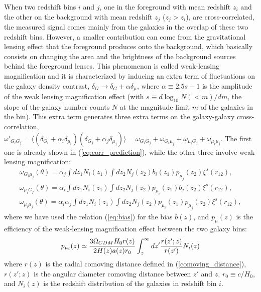 When two redshift bins $i$ and $j$, one in the foreground with mean redshift $z_i$ and the other on the background with mean redshift $z_j$ ($z_j > z_i$), are cross-correlated, the measured signal comes mainly from the galaxies in the overlap of these two redshift bins. However, a smaller contribution can come from the gravitational lensing effect that the foreground produces onto the background, which basically consists on changing the area and the brightness of the background sources behind the foreground lenses. This phenomenon is called weak-lensing magnification and it is characterized by inducing an extra term of fluctuations on the galaxy density contrast, $\delta_G \rightarrow \delta_G + \alpha \delta_\mu$, where $\alpha \equiv 2.5s-1$ is the amplitude of the weak lensing magnification effect (with $s \equiv d\log_{10}N(<m) / dm $, the slope of the galaxy number counts $N$ at the magnitude limit $m$ of the galaxies in the bin). This extra term generates three extra terms on the galaxy-galaxy cross-correlation, $\omega'_{G_iG_j} = \langle (\delta_{G_i} + \alpha_i \delta_{\mu_i}) (\delta_{G_j} + \alpha_j \delta_{\mu_j})\rangle = \omega_{G_iG_j} + \omega_{G_i\mu_j} + \omega_{\mu_i G_j} + \omega_{\mu_i \mu_j}$. The first one is already shown in (\ref{eq:corr_prediction}), while the other three involve weak-lensing magnification:
\begin{eqnarray}
\omega_{G_i\mu_j} (\theta) = \alpha_j \int dz_1 N_i(z_1) \int dz_2 N_j(z_2) b_i(z_1) p_{\mu_j}(z_2) \xi^s(r_{12}), \\
\omega_{\mu_iG_j} (\theta) = \alpha_i \int dz_1 N_i(z_1) \int dz_2 N_j(z_2) p_{\mu_i}(z_1) b_j(z_2) \xi^s(r_{12}), \\
\omega_{\mu_i\mu_j} (\theta) = \alpha_i \alpha_j \int dz_1 N_i(z_1) \int dz_2 N_j(z_2) p_{\mu_i}(z_1) p_{\mu_j}(z_2) \xi^s(r_{12}),
\end{eqnarray}
where we have used the relation (\ref{eq:bias}) for the bias $b(z)$, and $p_{\mu}(z)$ is the efficiency of the weak-lensing magnification effect between the two galaxy bins: 
\begin{equation}
p_{\mu_i}(z) \simeq {3\Omega_{CDM}H_0r(z) \over 2H(z)a(z)r_0}\int^\infty_z dz'{r(z';z) \over r(z')}N_i(z)
\end{equation}
where $r(z)$ is the radial comoving distance defined in (\ref{comoving_distance}), $r(z';z)$ is the angular diameter comoving distance between $z'$ and $z$, $r_0\equiv c/H_0$, and $N_i(z)$ is the redshift distribution of the galaxies in redshift bin $i$.
